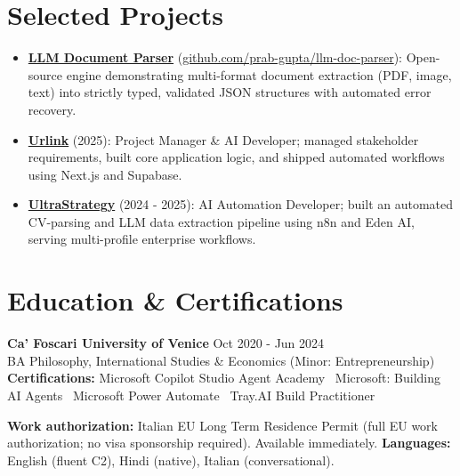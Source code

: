 \documentclass[a4paper,10pt]{article}
\begin{document}
\section{Selected Projects}
\begin{itemize}
 \item \textbf{\href{https://github.com/prab-gupta/llm-doc-parser}{LLM Document Parser}} (\href{https://github.com/prab-gupta/llm-doc-parser}{github.com/prab-gupta/llm-doc-parser}): Open-source engine demonstrating multi-format document extraction (PDF, image, text) into strictly typed, validated JSON structures with automated error recovery.
 \item \textbf{\href{https://smarturlink.com/}{Urlink}} (2025): Project Manager \& AI Developer; managed stakeholder requirements, built core application logic, and shipped automated workflows using Next.js and Supabase.
 \item \textbf{\href{https://ultrastrategy.com}{UltraStrategy}} (2024 - 2025): AI Automation Developer; built an automated CV-parsing and LLM data extraction pipeline using n8n and Eden AI, serving multi-profile enterprise workflows.
\end{itemize}

\section{Education \& Certifications}
\textbf{Ca' Foscari University of Venice} \hfill Oct 2020 - Jun 2024\\
BA Philosophy, International Studies \& Economics (Minor: Entrepreneurship)\\[1pt]
\textbf{Certifications:} Microsoft Copilot Studio Agent Academy \textbullet\ Microsoft: Building AI Agents \textbullet\ Microsoft Power Automate \textbullet\ Tray.AI Build Practitioner

\vspace{2pt}
{\small \textbf{Work authorization:} Italian EU Long Term Residence Permit (full EU work authorization; no visa sponsorship required). Available immediately. \quad \textbf{Languages:} English (fluent C2), Hindi (native), Italian (conversational).}
\end{document}
